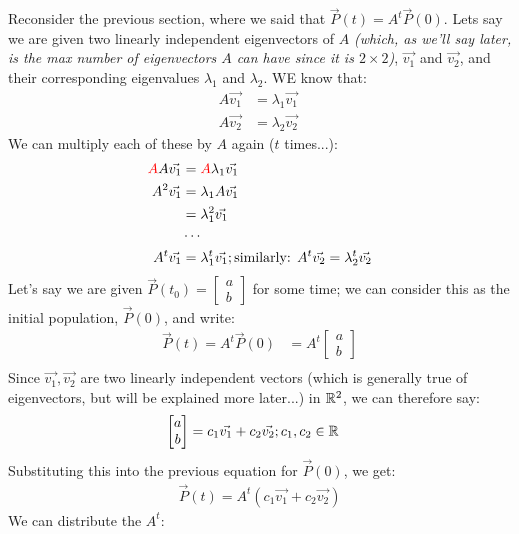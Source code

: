 \documentclass[12pt]{article}
\begin{document}
{{Reconsider the previous section, where we said that $\vec{P}(t) = A^t \vec{P}(0)$. Lets say we are given two linearly independent eigenvectors of $A$ \textit{(which, as we'll say later, is the max number of eigenvectors $A$ can have since it is $2 \times 2$)}, $\vec{v_1}$ and $\vec{v_2}$, and their corresponding eigenvalues $\lambda_1$ and $\lambda_2$. WE know that:
\begin{align*}
        A\vec{v_1} &= \lambda_1\vec{v_1}\\
        A\vec{v_2} &= \lambda_2\vec{v_2}\
\end{align*}
We can multiply each of these by $A$ again ($t$ times...):
\begin{align*}
    \textcolor{red}{A}A\vec{v_1} &= \textcolor{red}{A}\lambda_1\vec{v_1}\\
    A^2 \vec{v_1} &= \lambda_1A\vec{v_1}\\
    &= \lambda_1^2\vec{v_1}\\
    &\cdots\\
    A^t \vec{v_1} &= \lambda_1^t\vec{v_1}; \text{similarly: } A^t \vec{v_2} = \lambda_2^t\vec{v_2}
\end{align*}
Let's say we are given $\vec{P}(t_0) = \begin{bmatrix}
    a\\
    b\end{bmatrix}$ for some time; we can consider this as the initial population, $\vec{P}(0)$, and write:
\begin{align*}
    \vec{P}(t) = A^t\vec{P}(0) &= A^t\begin{bmatrix}
        a\\
        b\end{bmatrix}\\
\end{align*}
Since $\vec{v_1}, \vec{v_2}$ are two linearly independent vectors (which is generally true of eigenvectors, but will be explained more later...) in $\mathbb{R}^2$, we can therefore say:
\begin{align*}
    \begin{bmatrix}
        a\\
        b\end{bmatrix} &= c_1\vec{v_1} + c_2\vec{v_2}; c_1, c_2 \in \mathbb{R}
\end{align*}
Substituting this into the previous equation for $\vec{P}(0)$, we get:
\begin{align*}
    \vec{P}(t) = A^t(c_1\vec{v_1} + c_2\vec{v_2})
\end{align*}
We can distribute the $A^t$:
\begin{align*}

\end{align*}}}
\end{document}
